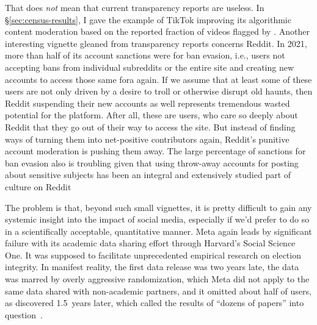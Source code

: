 That does \emph{not} mean that current transparency reports are useless. In
\S\ref{sec:census-results}, I gave the example of TikTok improving its algorithmic
content moderation based on the reported fraction of videos flagged by .
Another interesting vignette gleaned from transparency reports concerns Reddit.
In 2021, more than half of its account sanctions were for ban evasion, i.e.,
users not accepting bans from individual subreddits or the entire site and
creating new accounts to access those same fora again. If we assume that at
least some of these users are not only driven by a desire to troll or otherwise
disrupt old haunts, then Reddit suspending their new accounts as well represents
tremendous wasted potential for the platform. After all, these are users, who
care so deeply about Reddit that they go out of their way to access the site.
But instead of finding ways of turning them into net-positive contributors
again, Reddit's punitive account moderation is pushing them away. The large
percentage of sanctions for ban evasion also is troubling given that using
throw-away accounts for posting about sensitive subjects has been an integral
and extensively studied part of culture on
Reddit~\cite{AmmariSchoenebeckea2019,AndalibiHaimsonea2016,ChoudhuryDe2014,Leavitt2015,PavalanathanDeChoudhury2015,SchradingOvesdotterAlmea2015}

The problem is that, beyond such small vignettes, it is pretty difficult to gain
any systemic insight into the impact of social media, especially if we'd prefer
to do so in a scientifically acceptable, quantitative manner. Meta again leads
by significant failure with its academic data sharing effort through Harvard's
Social Science One. It was supposed to facilitate unprecedented empirical
research on election integrity. In manifest reality, the first data release was
two years late, the data was marred by overly aggressive randomization, which
Meta did not apply to the same data shared with non-academic partners, and it
omitted about half of  users, as discovered 1.5~years later, which called
the results of ``dozens of papers'' into
question~\cite{Hegelich2020,HegelichMarcoea2020,Ingram2022,OHaraNelson2019,Timberg2021}.

